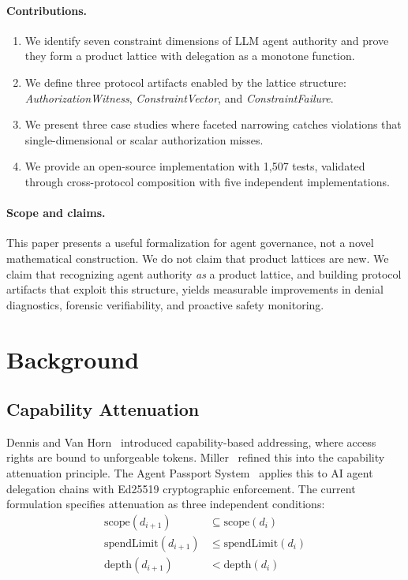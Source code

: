 \documentclass[sigconf,nonacm]{acmart}
\begin{document}
\paragraph{Contributions.}
\begin{enumerate}
\item We identify seven constraint dimensions of LLM agent authority and prove they form
      a product lattice with delegation as a monotone function.
\item We define three protocol artifacts enabled by the lattice structure:
      \emph{AuthorizationWitness}, \emph{ConstraintVector}, and \emph{ConstraintFailure}.
\item We present three case studies where faceted narrowing catches violations that
      single-dimensional or scalar authorization misses.
\item We provide an open-source implementation with 1,507 tests, validated through
      cross-protocol composition with five independent implementations.
\end{enumerate}

\paragraph{Scope and claims.} This paper presents a useful formalization for agent
governance, not a novel mathematical construction. We do not claim that product lattices
are new. We claim that recognizing agent authority \emph{as} a product lattice, and
building protocol artifacts that exploit this structure, yields measurable improvements
in denial diagnostics, forensic verifiability, and proactive safety monitoring.

\section{Background}

\subsection{Capability Attenuation}

Dennis and Van Horn~\cite{dennis1966} introduced capability-based addressing, where
access rights are bound to unforgeable tokens. Miller~\cite{miller2006} refined this
into the capability attenuation principle. The Agent Passport System~\cite{aeoess2026}
applies this to AI agent delegation chains with Ed25519 cryptographic enforcement.
The current formulation specifies attenuation as three independent conditions:
\begin{align}
\text{scope}(d_{i+1}) &\subseteq \text{scope}(d_i) \label{eq:scope} \\
\text{spendLimit}(d_{i+1}) &\leq \text{spendLimit}(d_i) \label{eq:spend} \\
\text{depth}(d_{i+1}) &< \text{depth}(d_i) \label{eq:depth}
\end{align}
\end{document}
